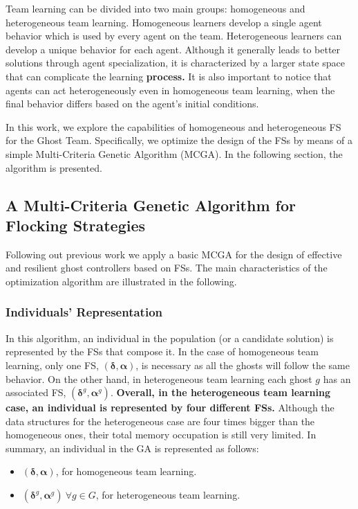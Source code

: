 \documentclass[journal]{IEEEtran}
\begin{document}
Team learning can be divided into two main groups: homogeneous and
heterogeneous team learning. Homogeneous learners develop a single
agent behavior which is used by every agent on the team. Heterogeneous
learners can develop a unique behavior for each agent. Although it
generally leads to better solutions through agent specialization, it
is characterized by a larger state space that can complicate the learning \textbf{process.} It is also
 important to notice that agents can act heterogeneously even in
 homogeneous team learning, when the final behavior differs based on
 the agent's initial conditions. 

In this work, we explore the capabilities of homogeneous and heterogeneous FS for the Ghost Team. Specifically, we optimize the design of the FSs by means of a simple Multi-Criteria Genetic Algorithm (MCGA). In the following section, the algorithm is presented.

\subsection{A Multi-Criteria Genetic Algorithm for Flocking Strategies}
Following out previous work \cite{Liberatore2014} we apply a basic MCGA for the design of effective and resilient ghost controllers based on FSs. The main characteristics of the optimization algorithm are illustrated in the following.

\subsubsection{Individuals' Representation}
In this algorithm, an individual in the population (or a candidate solution) is represented by the FSs that compose it. In the case of homogeneous team learning, only one FS, $(\boldsymbol\delta, \boldsymbol\alpha)$, is necessary as all the ghosts will follow the same behavior. On the other hand, in heterogeneous team learning each ghost $g$ has an associated FS, $(\boldsymbol\delta^g,  \boldsymbol\alpha^g)$. \textbf{Overall, in the heterogeneous team learning case, an individual is represented by four different FSs.} Although the data structures for the heterogeneous case are four times bigger than the homogeneous ones, their total memory occupation is still very limited. In summary, an individual in the GA is represented as follows:

\begin{itemize}
  \item $(\boldsymbol\delta, \boldsymbol\alpha)$, for homogeneous team learning.
  \item $(\boldsymbol\delta^g, \boldsymbol\alpha^g)\: \forall g \in G$, for heterogeneous team learning.
\end{itemize}
\end{document}
